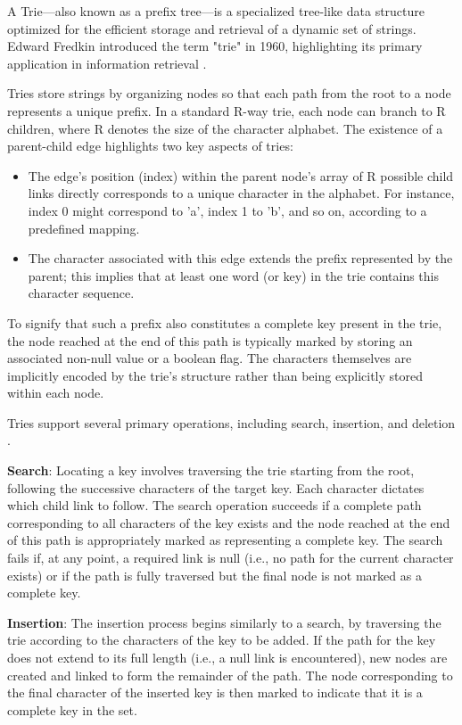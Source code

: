 
A Trie---also known as a prefix tree---is a specialized tree-like data structure optimized for the efficient storage and retrieval of a dynamic set of strings. Edward Fredkin introduced the term "trie" in 1960, highlighting its primary application in information retrieval \cite{Fredkin1960, Knuth1998}.

Tries store strings by organizing nodes so that each path from the root to a node represents a unique prefix. In a standard R-way trie, each node can branch to R children, where R denotes the size of the character alphabet. The existence of a parent-child edge highlights two key aspects of tries:
\begin{itemize}
    \item The edge's position (index) within the parent node's array of R possible child links directly corresponds to a unique character in the alphabet. For instance, index 0 might correspond to 'a', index 1 to 'b', and so on, according to a predefined mapping.
    \item The character associated with this edge extends the prefix represented by the parent; this implies that at least one word (or key) in the trie contains this character sequence.
\end{itemize}
To signify that such a prefix also constitutes a complete key present in the trie, the node reached at the end of this path is typically marked by storing an associated non-null value or a boolean flag. The characters themselves are implicitly encoded by the trie's structure rather than being explicitly stored within each node.


Tries support several primary operations, including search, insertion, and deletion \cite{SedgewickWayne2011}.

\textbf{Search}: Locating a key involves traversing the trie starting from the root, following the successive characters of the target key. Each character dictates which child link to follow. The search operation succeeds if a complete path corresponding to all characters of the key exists and the node reached at the end of this path is appropriately marked as representing a complete key. The search fails if, at any point, a required link is null (i.e., no path for the current character exists) or if the path is fully traversed but the final node is not marked as a complete key.

\textbf{Insertion}: The insertion process begins similarly to a search, by traversing the trie according to the characters of the key to be added. If the path for the key does not extend to its full length (i.e., a null link is encountered), new nodes are created and linked to form the remainder of the path. The node corresponding to the final character of the inserted key is then marked to indicate that it is a complete key in the set.

